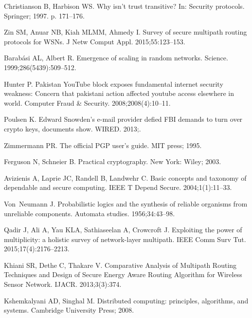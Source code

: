 \documentclass[10pt,letterpaper]{article}
\begin{document}
\begin{thebibliography}{10}
Christianson B, Harbison WS.
\newblock Why isn't trust transitive?
\newblock In: Security protocols. Springer; 1997. p. 171--176.

Zin SM, Anuar NB, Kiah MLMM, Ahmedy I.
\newblock Survey of secure multipath routing protocols for {WSNs}.
\newblock J Netw Comput Appl. 2015;55:123--153.

Barabási AL, Albert R.
\newblock Emergence of scaling in random networks.
\newblock Science. 1999;286(5439):509--512.

Hunter P.
\newblock Pakistan {YouTube} block exposes fundamental internet security
  weakness: {Concern} that pakistani action affected youtube access elsewhere
  in world.
\newblock Computer Fraud \& Security. 2008;2008(4):10--11.

Poulsen K.
\newblock Edward {Snowden}’s e-mail provider defied {FBI} demands to turn
  over crypto keys, documents show.
\newblock WIRED. 2013;.

Zimmermann PR.
\newblock The official {PGP} user's guide.
\newblock MIT press; 1995.

Ferguson N, Schneier B.
\newblock Practical cryptography.
\newblock New York: Wiley; 2003.

Avizienis A, Laprie JC, Randell B, Landwehr C.
\newblock Basic concepts and taxonomy of dependable and secure computing.
\newblock IEEE T Depend Secure. 2004;1(1):11--33.

Von~Neumann J.
\newblock Probabilistic logics and the synthesis of reliable organisms from
  unreliable components.
\newblock Automata studies. 1956;34:43--98.

Qadir J, Ali A, Yau KLA, Sathiaseelan A, Crowcroft J.
\newblock Exploiting the power of multiplicity: a holistic survey of
  network-layer multipath.
\newblock IEEE Comm Surv Tut. 2015;17(4):2176--2213.

Khiani SR, Dethe C, Thakare V.
\newblock Comparative {Analysis} of {Multipath} {Routing} {Techniques} and
  {Design} of {Secure} {Energy} {Aware} {Routing} {Algorithm} for {Wireless}
  {Sensor} {Network}.
\newblock IJACR. 2013;3(3):374.

Kshemkalyani AD, Singhal M.
\newblock Distributed computing: principles, algorithms, and systems.
\newblock Cambridge University Press; 2008.


\end{thebibliography}
\end{document}
